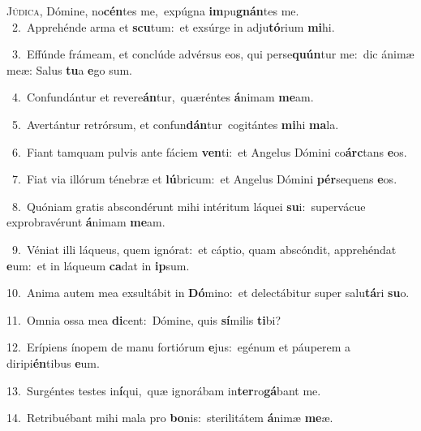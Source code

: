 \lettrine{\initial\textcolor{\initialcolor}{J}}{údica,} Dómine, no\-\textbf{cén}\-tes me,~\star expúgna \textbf{im}\-pu\-\textbf{gnán}\-tes me.\\
{\numbfont\textcolor{\numbcolor}{~2.}}~Apprehénde arma et \textbf{scu}\-tum:~\star et exsúrge in adju\-\textbf{tó}\-rium \textbf{mi}\-hi.\par
{\numbfont\textcolor{\numbcolor}{~3.}}~Effúnde frámeam, et conclúde advérsus eos, qui perse\-\textbf{quún}\-tur me:~\star dic ánimæ meæ: Salus \textbf{tu}\-a \textbf{e}\-go sum.\par
{\numbfont\textcolor{\numbcolor}{~4.}}~Confundántur et revere\-\textbf{án}\-tur,~\star quæréntes \textbf{á}\-nimam \textbf{me}\-am.\par
{\numbfont\textcolor{\numbcolor}{~5.}}~Avertántur retrórsum, et confun\-\textbf{dán}\-tur~\star cogitántes \textbf{mi}\-hi \textbf{ma}\-la.\par
{\numbfont\textcolor{\numbcolor}{~6.}}~Fiant tamquam pulvis ante fáciem \textbf{ven}\-ti:~\star et Angelus Dómini co\-\textbf{árc}\-tans \textbf{e}\-os.\par
{\numbfont\textcolor{\numbcolor}{~7.}}~Fiat via illórum ténebræ et \textbf{lú}\-bricum:~\star et Angelus Dómini \textbf{pér}\-sequens \textbf{e}\-os.\par
{\numbfont\textcolor{\numbcolor}{~8.}}~Quóniam gratis abscondérunt mihi intéritum láquei \textbf{su}\-i:~\star supervácue exprobravérunt \textbf{á}\-nimam \textbf{me}\-am.\par
{\numbfont\textcolor{\numbcolor}{~9.}}~Véniat illi láqueus, quem ignórat:~\dagger et cáptio, quam abscóndit, apprehéndat \textbf{e}\-um:~\star et in láqueum \textbf{ca}\-dat in \textbf{ip}\-sum.\par
{\numbfont\textcolor{\numbcolor}{10.}}~Anima autem mea exsultábit in \textbf{Dó}\-mino:~\star et delectábitur super salu\-\textbf{tá}\-ri \textbf{su}\-o.\par
{\numbfont\textcolor{\numbcolor}{11.}}~Omnia ossa mea \textbf{di}\-cent:~\star Dómine, quis \textbf{sí}\-milis \textbf{ti}\-bi?\par
{\numbfont\textcolor{\numbcolor}{12.}}~Erípiens ínopem de manu fortiórum \textbf{e}\-jus:~\star egénum et páuperem a diripi\-\textbf{én}\-tibus \textbf{e}\-um.\par
{\numbfont\textcolor{\numbcolor}{13.}}~Surgéntes testes in\-\textbf{í}\-qui,~\star quæ ignorábam in\-\textbf{ter}\-ro\-\textbf{gá}\-bant me.\par
{\numbfont\textcolor{\numbcolor}{14.}}~Retribuébant mihi mala pro \textbf{bo}\-nis:~\star sterilitátem \textbf{á}\-nimæ \textbf{me}\-æ.\par
